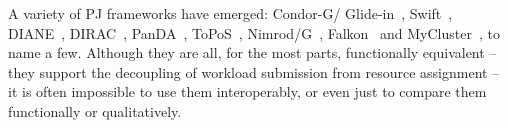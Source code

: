 \documentclass[conference]{IEEEtran}
\begin{document}
A variety of PJ frameworks have emerged: Condor-G/
Glide-in~\cite{condor-g}, Swift~\cite{Wilde2011},
DIANE~\cite{Moscicki:908910}, DIRAC~\cite{1742-6596-219-6-062049},
PanDA~\cite{1742-6596-219-6-062041}, ToPoS~\cite{topos},
Nimrod/G~\cite{10.1109/HPC.2000.846563}, Falkon~\cite{1362680} and
MyCluster~\cite{1652061}, to name a few. Although they are all, for
the most parts, functionally equivalent -- they support the decoupling
of workload submission from resource assignment -- it is often
impossible to use them interoperably, or even just to compare them
functionally or qualitatively.







\end{document}
